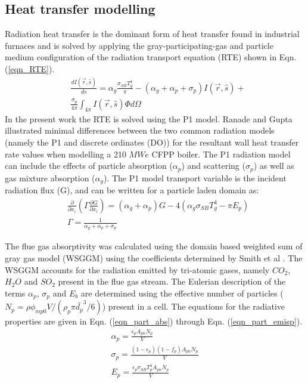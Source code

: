 \documentclass[twocolumn,10pt]{asme2ej}
\begin{document}
\subsection{Heat transfer modelling}
Radiation heat transfer is the dominant form of heat transfer found in industrial furnaces \cite{Basu2000} and is solved by applying the gray-participating-gas and particle medium configuration of the radiation transport equation (RTE) \cite{Modest2013} shown in Eqn. (\ref{eqn_RTE}).
\begin{equation}\label{eqn_RTE}
\begin{split}
&\frac{d I(\vec{r},\hat{s})}{ds} = \alpha_g \frac{\sigma_{SB} T_{g}^4}{\pi}-(\alpha_g+\alpha_p+\sigma_p)I(\vec{r},\hat{s}) + \\
&\frac{\sigma_p}{4\pi}\int_{4\pi}I(\vec{r},\hat{s})\Phi d \Omega
\end{split}
\end{equation}
In the present work the RTE is solved using the P1 model. Ranade and Gupta \cite{Ranade2015} illustrated minimal differences between the two common radiation models (namely the P1 and discrete ordinates (DO)) for the resultant wall heat transfer rate values when modelling a 210 $MWe$ CFPP boiler. The P1 radiation model can include the effects of particle absorption ($\alpha_p$) and scattering ($\sigma_p$) as well as gas mixture absorption ($\alpha_g$). The P1 model transport variable is the incident radiation flux (G), and can be written for a particle laden domain as:
\begin{equation}
\begin{split}
&\frac{\partial}{\partial x_{i}}\left(\Gamma\frac{\partial G}{\partial x_{i}}\right)=\left(\alpha_g+\alpha_p\right)G-4\left(\alpha_g \sigma_{SB} T_{g}^4-\pi E_p \right)\\
&\Gamma = \frac{1}{\alpha_g+\alpha_p+\sigma_p}
\end{split}
\end{equation}

The flue gas absorptivity was calculated using the domain based weighted sum of gray gas model (WSGGM) using the coefficients determined by Smith et al \cite{Smith1982}. The WSGGM accounts for the radiation emitted by tri-atomic gases, namely $CO_2$, $H_2O$ and $SO_2$ present in the flue gas stream. The Eulerian description of the terms $\alpha_p$, $\sigma_p$ and $E_b$ are determined using the effective number of particles ($N_p = \rho \phi_{mp0} V / \left( \rho_p \pi \bar{d_p}^3 /6 \right)$) present in a cell. The equations for the radiative properties are given in Eqn. (\ref{eqn_part_abs}) through Eqn. (\ref{eqn_part_emisp}).
\begin{gather}
\alpha_p = \frac{\epsilon_p A_{pn}N_p}{V} \label{eqn_part_abs}\\
\sigma_p = \frac{(1-\epsilon_p)(1-f_p) A_{pn}N_p}{V} \label{eqn_part_scat} \\
E_p = \frac{\epsilon_p \sigma_{SB} T_p^4 A_{pn}N_p}{V}\label{eqn_part_emisp}
\end{gather}
\end{document}
